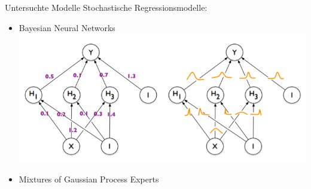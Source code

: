 \documentclass[18pt]{beamer}
\begin{document}
\begin{frame}{Untersuchte Modelle}
  Stochastische Regressionsmodelle:
  \begin{itemize}
  \item Bayesian Neural Networks
    \includegraphics[scale=0.35]{images/bnn}
  \item Mixtures of Gaussian Process Experts
  \end{itemize}
\end{frame}
\end{document}
